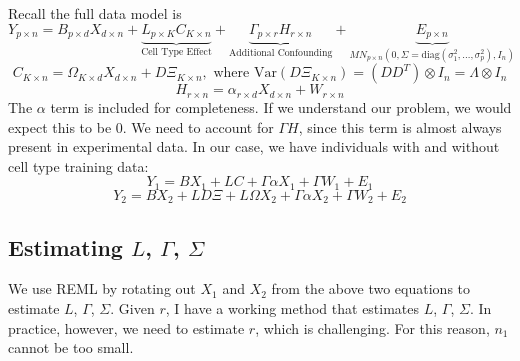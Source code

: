 \documentclass{article}
\begin{document}
Recall the full data model is
\[
Y_{p \times n} = B_{p \times d}X_{d \times n} + \underbrace{L_{p \times K}C_{K \times n}}_{\text{Cell Type Effect}} + \underbrace{\Gamma_{p \times r}H_{r \times n}}_{\text{Additional Confounding}} + \underbrace{E_{p \times n}}_{MN_{p \times n}\left( 0, \Sigma = \text{diag}\left( \sigma_1^2, \ldots, \sigma_p^2 \right), I_n \right)}
\]
\[
C_{K \times n} = \Omega_{K \times d}X_{d \times n} + D\Xi_{K \times n}, \text{ where } \text{Var}\left( D\Xi_{K \times n} \right) = \left( DD^T \right) \otimes I_n = \Lambda \otimes I_n
\]
\[
H_{r \times n} = \alpha_{r \times d}X_{d \times n} + W_{r \times n}
\]
The $\alpha$ term is included for completeness. If we understand our problem, we would expect this to be 0. We need to account for $\Gamma H$, since this term is almost always present in experimental data. In our case, we have individuals with and without cell type training data:
\[
Y_1 = BX_1 + LC + \Gamma\alpha X_1 + \Gamma W_1 + E_1
\]
\[
Y_2 = BX_2 + LD\Xi + L\Omega X_2 + \Gamma \alpha X_2 + \Gamma W_2 + E_2
\]
\subsection*{Estimating $L$, $\Gamma$, $\Sigma$}
We use REML by rotating out $X_1$ and $X_2$ from the above two equations to estimate $L$, $\Gamma$, $\Sigma$. Given $r$, I have a working method that estimates $L$, $\Gamma$, $\Sigma$. In practice, however, we need to estimate $r$, which is challenging. For this reason, $n_1$ cannot be too small.
\end{document}
